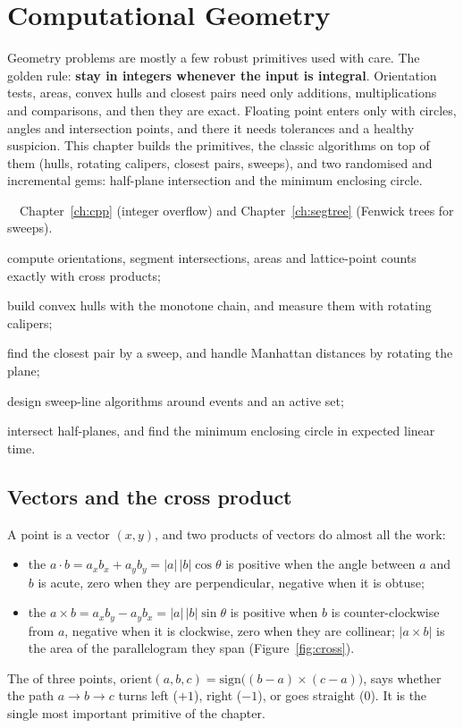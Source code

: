 \chapter{Computational Geometry}\label{ch:geometry}

Geometry problems are mostly a few robust primitives used with care. The golden rule: \textbf{stay in integers whenever the input is
integral}. Orientation tests, areas, convex hulls and closest pairs need only additions, multiplications and comparisons, and then they
are exact. Floating point enters only with circles, angles and intersection points, and there it needs tolerances and a healthy
suspicion. This chapter builds the primitives, the classic algorithms on top of them (hulls, rotating calipers, closest pairs, sweeps),
and two randomised and incremental gems: half-plane intersection and the minimum enclosing circle.

\begin{chapterintro}{\gold\ \plat\ \ioi}{Chapter~\ref{ch:cpp} (integer overflow) and Chapter~\ref{ch:segtree} (Fenwick trees for
sweeps).}
  \item compute orientations, segment intersections, areas and lattice-point counts exactly with cross products;
  \item build convex hulls with the monotone chain, and measure them with rotating calipers;
  \item find the closest pair by a sweep, and handle Manhattan distances by rotating the plane;
  \item design sweep-line algorithms around events and an active set;
  \item intersect half-planes, and find the minimum enclosing circle in expected linear time.
\end{chapterintro}

\section[Vectors and the cross product]{Vectors and the cross product \hfill \gold}\label{sec:vectors}

A point is a vector $(x, y)$, and two products of vectors do almost all the work:
\begin{itemize}
  \item the  $a \cdot b = a_x b_x + a_y b_y = |a|\,|b| \cos\theta$ is positive when the angle between $a$ and $b$ is
        acute, zero when they are perpendicular, negative when it is obtuse;
  \item the  $a \times b = a_x b_y - a_y b_x = |a|\,|b| \sin\theta$ is positive when $b$ is counter-clockwise from
        $a$, negative when it is clockwise, zero when they are collinear; $|a \times b|$ is the area of the parallelogram they span
        (Figure~\ref{fig:cross}).
\end{itemize}
The  of three points, $\mathrm{orient}(a, b, c) = \mathrm{sign}\bigl((b - a) \times (c - a)\bigr)$, says whether the
path $a \to b \to c$ turns left ($+1$), right ($-1$), or goes straight (0). It is the single most important primitive of the chapter.

